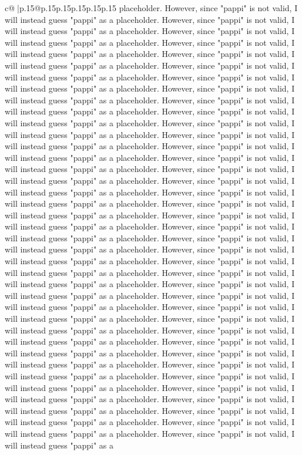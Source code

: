 \documentclass{article}
\begin{document}
{\begin{supertabular}{c@{$\;$}|p{.15\linewidth}@{}p{.15\linewidth}p{.15\linewidth}p{.15\linewidth}p{.15\linewidth}p{.15\linewidth}}
{{{placeholder. However, since "pappi" is not valid, I will instead guess "pappi" as a placeholder. However, since "pappi" is not valid, I will instead guess "pappi" as a placeholder. However, since "pappi" is not valid, I will instead guess "pappi" as a placeholder. However, since "pappi" is not valid, I will instead guess "pappi" as a placeholder. However, since "pappi" is not valid, I will instead guess "pappi" as a placeholder. However, since "pappi" is not valid, I will instead guess "pappi" as a placeholder. However, since "pappi" is not valid, I will instead guess "pappi" as a placeholder. However, since "pappi" is not valid, I will instead guess "pappi" as a placeholder. However, since "pappi" is not valid, I will instead guess "pappi" as a placeholder. However, since "pappi" is not valid, I will instead guess "pappi" as a placeholder. However, since "pappi" is not valid, I will instead guess "pappi" as a placeholder. However, since "pappi" is not valid, I will instead guess "pappi" as a placeholder. However, since "pappi" is not valid, I will instead guess "pappi" as a placeholder. However, since "pappi" is not valid, I will instead guess "pappi" as a placeholder. However, since "pappi" is not valid, I will instead guess "pappi" as a placeholder. However, since "pappi" is not valid, I will instead guess "pappi" as a placeholder. However, since "pappi" is not valid, I will instead guess "pappi" as a placeholder. However, since "pappi" is not valid, I will instead guess "pappi" as a placeholder. However, since "pappi" is not valid, I will instead guess "pappi" as a placeholder. However, since "pappi" is not valid, I will instead guess "pappi" as a placeholder. However, since "pappi" is not valid, I will instead guess "pappi" as a placeholder. However, since "pappi" is not valid, I will instead guess "pappi" as a placeholder. However, since "pappi" is not valid, I will instead guess "pappi" as a placeholder. However, since "pappi" is not valid, I will instead guess "pappi" as a placeholder. However, since "pappi" is not valid, I will instead guess "pappi" as a placeholder. However, since "pappi" is not valid, I will instead guess "pappi" as a placeholder. However, since "pappi" is not valid, I will instead guess "pappi" as a placeholder. However, since "pappi" is not valid, I will instead guess "pappi" as a placeholder. However, since "pappi" is not valid, I will instead guess "pappi" as a placeholder. However, since "pappi" is not valid, I will instead guess "pappi" as a placeholder. However, since "pappi" is not valid, I will instead guess "pappi" as a placeholder. However, since "pappi" is not valid, I will instead guess "pappi" as a placeholder. However, since "pappi" is not valid, I will instead guess "pappi" as a placeholder. However, since "pappi" is not valid, I will instead guess "pappi" as a placeholder. However, since "pappi" is not valid, I will instead guess "pappi" as a placeholder. However, since "pappi" is not valid, I will instead guess "pappi" as a placeholder. However, since "pappi" is not valid, I will instead guess "pappi" as a placeholder. However, since "pappi" is not valid, I will instead guess "pappi" as a }}}
\end{supertabular}}
\end{document}
